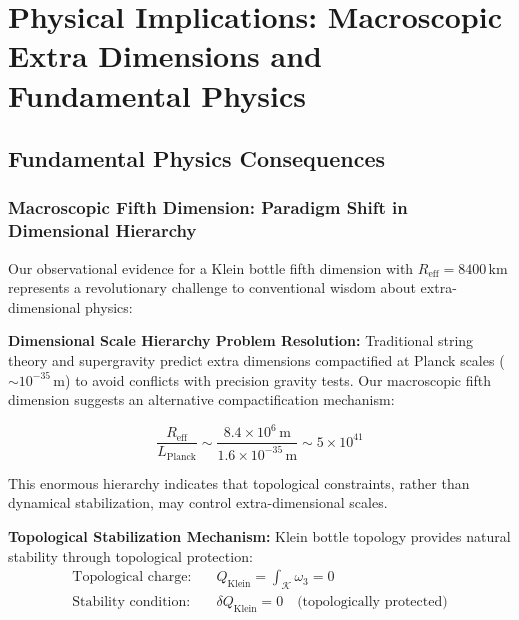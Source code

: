 \documentclass[reprint,amsmath,amssymb,aps,prd]{revtex4-2}
\newcommand{\Reff}{R_{\text{eff}}}
\newcommand{\km}{\,\text{km}}
\newcommand{\Klein}{\mathcal{K}}
\begin{document}

\section{Physical Implications: Macroscopic Extra Dimensions and Fundamental Physics}
\label{sec:implications}

\subsection{Fundamental Physics Consequences}

\subsubsection{Macroscopic Fifth Dimension: Paradigm Shift in Dimensional Hierarchy}

Our observational evidence for a Klein bottle fifth dimension with $\Reff = 8400\km$ represents a revolutionary challenge to conventional wisdom about extra-dimensional physics:

\textbf{Dimensional Scale Hierarchy Problem Resolution:}
Traditional string theory and supergravity predict extra dimensions compactified at Planck scales ($\sim 10^{-35}\,\text{m}$) to avoid conflicts with precision gravity tests. Our macroscopic fifth dimension suggests an alternative compactification mechanism:

\begin{equation}
\frac{\Reff}{L_{\text{Planck}}} \sim \frac{8.4 \times 10^6\,\text{m}}{1.6 \times 10^{-35}\,\text{m}} \sim 5 \times 10^{41}
\end{equation}

This enormous hierarchy indicates that topological constraints, rather than dynamical stabilization, may control extra-dimensional scales.

\textbf{Topological Stabilization Mechanism:}
Klein bottle topology provides natural stability through topological protection:
\begin{align}
\text{Topological charge}: \quad &Q_{\text{Klein}} = \int_{\Klein} \omega_3 = 0 \\
\text{Stability condition}: \quad &\delta Q_{\text{Klein}} = 0 \quad \text{(topologically protected)}
\end{align}
\end{document}
